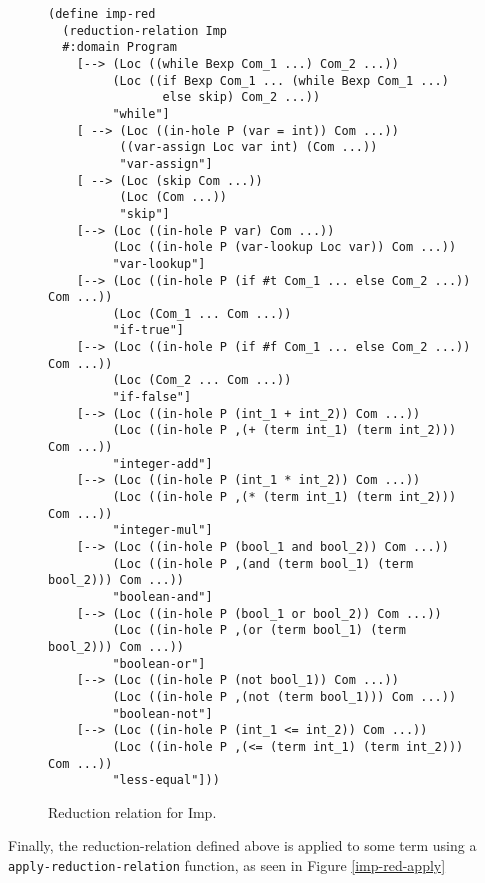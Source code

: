 \begin{figure}[htb]
\begin{verbatim}
(define imp-red 
  (reduction-relation Imp
  #:domain Program 
    [--> (Loc ((while Bexp Com_1 ...) Com_2 ...))
         (Loc ((if Bexp Com_1 ... (while Bexp Com_1 ...) 
                else skip) Com_2 ...))
         "while"]
    [ --> (Loc ((in-hole P (var = int)) Com ...))
          ((var-assign Loc var int) (Com ...))
          "var-assign"]
    [ --> (Loc (skip Com ...))
          (Loc (Com ...))
          "skip"]
    [--> (Loc ((in-hole P var) Com ...))
         (Loc ((in-hole P (var-lookup Loc var)) Com ...))
         "var-lookup"]
    [--> (Loc ((in-hole P (if #t Com_1 ... else Com_2 ...)) Com ...))
         (Loc (Com_1 ... Com ...))
         "if-true"]
    [--> (Loc ((in-hole P (if #f Com_1 ... else Com_2 ...)) Com ...))
         (Loc (Com_2 ... Com ...))
         "if-false"]
    [--> (Loc ((in-hole P (int_1 + int_2)) Com ...))
         (Loc ((in-hole P ,(+ (term int_1) (term int_2))) Com ...))
         "integer-add"]
    [--> (Loc ((in-hole P (int_1 * int_2)) Com ...))
         (Loc ((in-hole P ,(* (term int_1) (term int_2))) Com ...))
         "integer-mul"]
    [--> (Loc ((in-hole P (bool_1 and bool_2)) Com ...))
         (Loc ((in-hole P ,(and (term bool_1) (term bool_2))) Com ...))
         "boolean-and"]
    [--> (Loc ((in-hole P (bool_1 or bool_2)) Com ...))
         (Loc ((in-hole P ,(or (term bool_1) (term bool_2))) Com ...))
         "boolean-or"]
    [--> (Loc ((in-hole P (not bool_1)) Com ...))
         (Loc ((in-hole P ,(not (term bool_1))) Com ...))
         "boolean-not"]
    [--> (Loc ((in-hole P (int_1 <= int_2)) Com ...))
         (Loc ((in-hole P ,(<= (term int_1) (term int_2))) Com ...))
         "less-equal"]))
\end{verbatim}
\caption{Reduction relation for Imp.}
\label{imp-define-red}
\end{figure}

Finally, the reduction-relation defined above is applied to some term using a \newline \texttt{apply-reduction-relation} function, as seen in Figure \ref{imp-red-apply}

